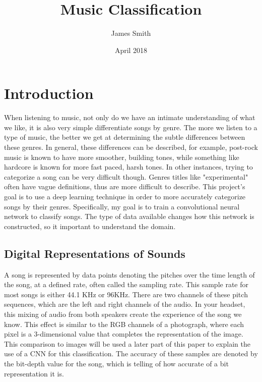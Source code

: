 \documentclass{article}
\title{Music Classification}
\author{James Smith}
\date{April 2018}
\begin{document}
\maketitle

\section{Introduction}
When listening to music, not only do we have an intimate understanding of what we like, it is also very simple differentiate songs by genre. The more we listen to a type of music, the better we get at determining the subtle differences between these genres. In general, these differences can be described, for example, post-rock music is known to have more smoother, building tones, while something like hardcore is known for more fast paced, harsh tones. In other instances, trying to categorize a song can be very difficult though. Genres titles like "experimental" often have vague definitions, thus are more difficult to describe. This project's goal is to use a deep learning technique in order to more accurately categorize songs by their genres. Specifically, my goal is to train a convolutional neural network to classify songs. The type of data available changes how this network is constructed, so it important to understand the domain.
\subsection{Digital Representations of Sounds}
 A song is represented by data points denoting the pitches over the time length of the song, at a defined rate, often called the sampling rate.  This sample rate for most songs is either 44.1 KHz or 96KHz. There are two channels of these pitch sequences, which are the left and right channels of the audio. In your headset, this mixing of audio from both speakers create the experience of the song we know. This effect is similar to the RGB channels of a photograph, where each pixel is a 3-dimensional value that completes the representation of the image. This comparison to images will be used a later part of this paper to explain the use of a CNN for this classification. The accuracy of these samples are denoted by the bit-depth value for the song, which is telling of how accurate of a bit representation it is.
\end{document}
